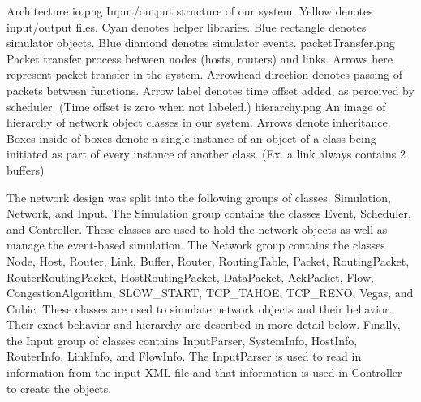 

Architecture
io.png
Input/output structure of our system. Yellow denotes input/output files. Cyan denotes helper libraries. Blue rectangle denotes simulator objects. Blue diamond denotes simulator events. 
packetTransfer.png
Packet transfer process between nodes (hosts, routers) and links. Arrows here represent packet transfer in the system. Arrowhead direction denotes passing of packets between functions. Arrow label denotes time offset added, as perceived by scheduler. (Time offset is zero when not labeled.)
hierarchy.png
An image of hierarchy of network object classes in our system. Arrows denote inheritance. Boxes inside of boxes denote a single instance of an object of a class being initiated as part of every instance of another class. (Ex. a link always contains 2 buffers)

    The network design was split into the following groups of classes. Simulation, Network, and Input. The Simulation group contains the classes Event, Scheduler, and Controller. These classes are used to hold the network objects as well as manage the event-based simulation. The Network group contains the classes Node, Host, Router, Link, Buffer, Router, RoutingTable, Packet, RoutingPacket, RouterRoutingPacket, HostRoutingPacket, DataPacket, AckPacket, Flow, CongestionAlgorithm, SLOW\_START, TCP\_TAHOE, TCP\_RENO, Vegas, and Cubic. These classes are used to simulate network objects and their behavior. Their exact behavior and hierarchy are described in more detail below. Finally, the Input group of classes contains InputParser, SystemInfo, HostInfo, RouterInfo, LinkInfo, and FlowInfo. The InputParser is used to read in information from the input XML file and that information is used in Controller to create the objects.


